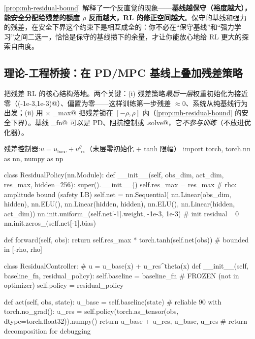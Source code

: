 \begin{insight}[保守的基线和强力的残差相互成全]
\cref{prop:mh-residual-bound} 解释了一个反直觉的现象——\textbf{基线越保守（裕度越大），能安全分配给残差的额度 $\rho$ 反而越大，RL 的修正空间越大}。保守的基线和强力的残差，在安全下界这个约束下是相互成全的：你不必在“保守基线”和“强力学习”之间二选一，恰恰是保守的基线攒下的余量，才让你能放心地给 RL 更大的探索自由度。
\end{insight}

\subsection{理论-工程桥接：在 PD/MPC 基线上叠加残差策略}
\label{sec:mh-residual-code}

把残差 RL 的核心结构落地。两个关键：(i) 残差策略\emph{最后一层}权重初始化为接近零（\verb@uniform(-1e-3,1e-3)@）、偏置为零——这样训练第一步残差 $\approx0$、系统从纯基线行为出发；(ii) 用 \verb@tanh@ $\times$ \verb@res_max@ 把残差锁在 $[-\rho,\rho]$ 内（\cref{prop:mh-residual-bound} 的安全下界）。基线 \verb@baseline_fn@ 可以是 PD、阻抗控制或 \verb@MPC.solve@，它\emph{不参与训练}（不放进优化器）。

\begin{codebox}[Python]{残差控制器:$u=u_{\text{base}}+u_{\text{res}}^{\theta}$（末层零初始化 $+$ tanh 限幅）}
import torch, torch.nn as nn, numpy as np

class ResidualPolicy(nn.Module):
    def __init__(self, obs_dim, act_dim, res_max, hidden=256):
        super().__init__()
        self.res_max = res_max                  # rho: amplitude bound (safety LB)
        self.net = nn.Sequential(
            nn.Linear(obs_dim, hidden), nn.ELU(),
            nn.Linear(hidden, hidden), nn.ELU(),
            nn.Linear(hidden, act_dim))
        nn.init.uniform_(self.net[-1].weight, -1e-3, 1e-3)   # init residual ~ 0
        nn.init.zeros_(self.net[-1].bias)

    def forward(self, obs):
        return self.res_max * torch.tanh(self.net(obs))      # bounded in [-rho, rho]

class ResidualController:                       # u = u_base(x) + u_res^theta(x)
    def __init__(self, baseline_fn, residual_policy):
        self.baseline = baseline_fn             # FROZEN (not in optimizer)
        self.policy = residual_policy

    def act(self, obs, state):
        u_base = self.baseline(state)           # reliable 90%
        with torch.no_grad():
            u_res = self.policy(torch.as_tensor(obs, dtype=torch.float32)).numpy()
        return u_base + u_res, u_base, u_res    # return decomposition for debugging
\end{codebox}

